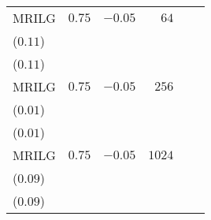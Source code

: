 \begin{table}[t]
\begin{tabular}{lrrrrr}
MRILG & \(0.75\) & \(-0.05\) & \(64\) & \longcell{\(0.12\)\\{\tiny(\(0.11\))}} & \longcell{\(0.12\)\\{\tiny(\(0.11\))}} \\[2.2ex]
MRILG & \(0.75\) & \(-0.05\) & \(256\) & \longcell{\(0.21\)\\{\tiny(\(0.01\))}} & \longcell{\(0.21\)\\{\tiny(\(0.01\))}} \\[2.2ex]
MRILG & \(0.75\) & \(-0.05\) & \(1024\) & \longcell{\(0.11\)\\{\tiny(\(0.09\))}} & \longcell{\(0.11\)\\{\tiny(\(0.09\))}} \\
\bottomrule
\end{tabular}
\end{table}
